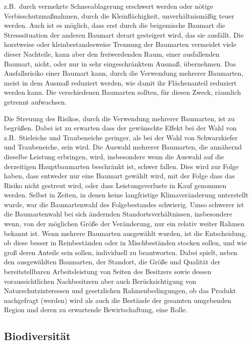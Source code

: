 \documentclass[twocolumn]{scrartcl}
\begin{document}
z.B.\ durch vermehrte Schneeablagerung erschwert werden oder nötige
Verbisschutzmaßnahmen, durch die Kleinflächigkeit, unverhältnismäßig
teuer werden. Auch ist es möglich, dass erst durch die beigemische
Baumart die Stresssituation der anderen Baumart derart gesteigert
wird, das sie ausfällt. Die horstweise oder kleinbestandesweise
Trennung der Baumarten vermeidet viele dieser Nachteile, kann aber den
freiwerdenden Raum, einer ausfallenden Baumart, nicht, oder nur in
sehr eingeschränktem Ausmaß, übernehmen. Das Ausfallsrisiko einer
Baumart kann, durch die Verwendung mehrerer Baumarten, meist in dem
Ausmaß reduziert werden, wie damit ihr Flächenanteil reduziert werden
kann. Die verschiedenen Baumarten sollten, für diesen Zweck, räumlich
getrennt aufwachsen.

Die Streuung des Risikos, durch die Verwendung mehrerer Baumarten, ist
zu begrüßen. Dabei ist zu erwarten dass der gewünschte Effekt bei der
Wahl von z.B.\ Stieleiche und Traubeneiche geringer, als bei der Wahl
von Schwarzkiefer und Traubeneiche, sein wird. Die Auswahl mehrerer
Baumarten, die annähernd dieselbe Leistung erbringen, wird,
insbesondere wenn die Auswahl auf die derzeitigen Hauptbaumarten
beschränkt ist, schwer fallen. Dies wird zur Folge haben, dass
entweder nur eine Baumart gewählt wird, mit der Folge dass das Risiko
nicht gestreut wird, oder dass Leistungsverluste in Kauf genommen
werden. Selbst in Zeiten, in denen keine langfristige Klimaveränderung
unterstellt wurde, war die Baumartenwahl des Folgebestandes
schwierig. Umso schwerer ist die Baumartenwahl bei sich ändernden
Standortsverhältnissen, insbesondere wenn, von der möglichen Größe der
Veränderung, nur ein relativ weiter Rahmen bekannt ist. Wenn mehrere
Baumarten ausgewählt wurden, ist die Entscheidung, ob diese besser in
Reinbeständen oder in Mischbeständen stocken sollen, und wie groß
deren Anteile sein sollen, individuell zu beantworten. Dabei spielt,
neben den ausgewählten Baumarten, der Standort, die Größe und Qualität
der bereitstellbaren Arbeitsleistung von Seiten des Besitzers sowie
dessen voraussichtlichen Nachbesitzern aber auch Berücksichtigung von
Naturschutzinteressen und gesetzlichen Rahmenbedingungen, ob das
Produkt nachgefragt (werden) wird als auch die Bestände der gesamten
umgebenden Region und deren zu erwartende Bewirtschaftung, eine Rolle.

\subsection{Biodiversität}
\label{ssec:biodiversitaet}
\end{document}
